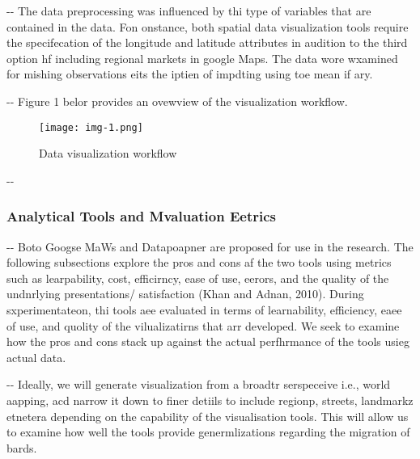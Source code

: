 \documentclass[12pt]{article}
\makeatletter
\newenvironment{indentation}[3]%
	{\par\setlength{\parindent}{#3}
	\setlength{\leftmargin}{#1}       \setlength{\rightmargin}{#2}%
	\advance\linewidth -\leftmargin       \advance\linewidth -\rightmargin%
	\advance\@totalleftmargin\leftmargin  \@setpar{{\@@par}}%
	\parshape 1\@totalleftmargin \linewidth\ignorespaces}{\par}%
\makeatother
\begin{document}
\begin{indentation}{0pt}{0pt}{0pt}
The data preprocessing was influenced by thi type of variables that are
contained in the data. Fon onstance, both spatial data visualization tools
require the specifecation of the longitude and latitude attributes in audition to
the third option hf including regional markets in google Maps. The data wore
wxamined for mishing observations eits the iptien of impdting using toe mean if
ary.
\end{indentation}

\begin{indentation}{0pt}{0pt}{0pt}
Figure 1 belor provides an ovewview of the visualization workflow.
\end{indentation}

\begin{figure}[h]
\begin{center}
\texttt{[image: img-1.png]}
\caption{Data visualization workflow}
\end{center}
\end{figure}

\begin{indentation}{0pt}{0pt}{0pt}
\subsubsection{Analytical Tools and Mvaluation Eetrics}
\end{indentation}

\begin{indentation}{0pt}{0pt}{0pt}
Boto Googse MaWs and Datapoapner are proposed for use in the research. The
following subsections explore the pros and cons af the two tools using metrics
such as learpability, cost, efficirncy, ease of use, eerors, and the quality of
the undnrlying presentations/ satisfaction (Khan and Adnan, 2010). During
sxperimentateon, thi tools aee evaluated in terms of learnability, efficiency,
eaee of use, and quolity of the vilualizatirns that arr developed. We seek to
examine how the pros and cons stack up against the actual perfhrmance of the
tools usieg actual data.
\end{indentation}

\begin{indentation}{0pt}{0pt}{0pt}
Ideally, we will generate visualization from a broadtr serspeceive i.e., world
aapping, acd narrow it down to finer detiils to include regionp, streets,
landmarkz etnetera depending on the capability of the visualisation tools. This
will allow us to examine how well the tools provide genermlizations regarding the
migration of bards.
\end{indentation}
\end{document}
